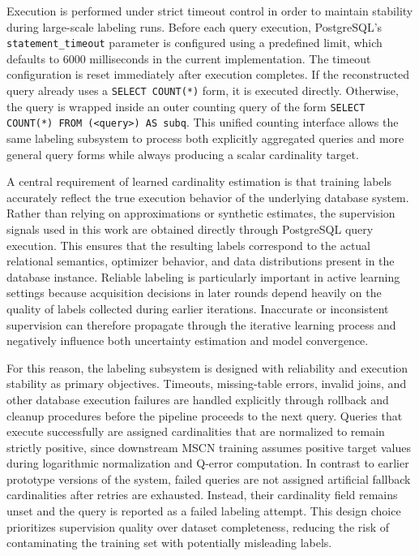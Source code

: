 Execution is performed under strict timeout control in order to maintain stability during large-scale labeling runs. Before each query execution, PostgreSQL's \texttt{statement\_timeout} parameter is configured using a predefined limit, which defaults to 6000 milliseconds in the current implementation. The timeout configuration is reset immediately after execution completes. If the reconstructed query already uses a \texttt{SELECT COUNT(*)} form, it is executed directly. Otherwise, the query is wrapped inside an outer counting query of the form \texttt{SELECT COUNT(*) FROM (<query>) AS subq}. This unified counting interface allows the same labeling subsystem to process both explicitly aggregated queries and more general query forms while always producing a scalar cardinality target.

A central requirement of learned cardinality estimation is that training labels accurately reflect the true execution behavior of the underlying database system. Rather than relying on approximations or synthetic estimates, the supervision signals used in this work are obtained directly through PostgreSQL query execution. This ensures that the resulting labels correspond to the actual relational semantics, optimizer behavior, and data distributions present in the database instance. Reliable labeling is particularly important in active learning settings because acquisition decisions in later rounds depend heavily on the quality of labels collected during earlier iterations. Inaccurate or inconsistent supervision can therefore propagate through the iterative learning process and negatively influence both uncertainty estimation and model convergence.

For this reason, the labeling subsystem is designed with reliability and execution stability as primary objectives. Timeouts, missing-table errors, invalid joins, and other database execution failures are handled explicitly through rollback and cleanup procedures before the pipeline proceeds to the next query. Queries that execute successfully are assigned cardinalities that are normalized to remain strictly positive, since downstream MSCN training assumes positive target values during logarithmic normalization and Q-error computation. In contrast to earlier prototype versions of the system, failed queries are not assigned artificial fallback cardinalities after retries are exhausted. Instead, their cardinality field remains unset and the query is reported as a failed labeling attempt. This design choice prioritizes supervision quality over dataset completeness, reducing the risk of contaminating the training set with potentially misleading labels.

